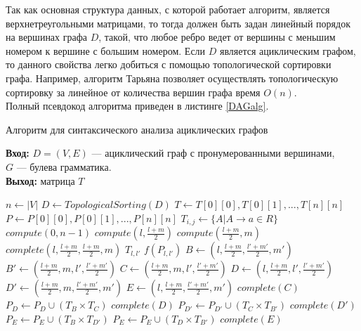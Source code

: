 \documentclass{spbau-diploma}
\begin{document}
Так как основная структура данных, с которой работает алгоритм,
является верхнетреугольными матрицами, то тогда должен быть
задан линейный порядок на вершинах графа $D$, такой, что любое
ребро ведет от вершины с меньшим номером к вершине с
большим номером. Если $D$ является ациклическим графом, то
данного свойства легко добиться с помощью топологической
сортировки графа. Например, алгоритм Тарьяна \cite{Tarjan} позволяет
осуществлять топологическую сортировку за линейное от
количества вершин графа время $O(n)$.
\\
Полный псевдокод алгоритма приведен в листинге \ref{DAGalg}.
\begin{algorithm}
\caption{Алгоритм для синтаксического анализа ациклических графов}\label{DAGalg}
 \hspace*{\algorithmicindent} \textbf{Вход:} $D = (V, E)$ --- ациклический граф с пронумерованными вершинами, \\$G$ ---  булева грамматика.\\
 \hspace*{\algorithmicindent} \textbf{Выход:} матрица $T$
\begin{algorithmic}[1]
\State $n \gets  |V|$
\State $D \gets TopologicalSorting(D)$
\State $T \gets T[0][0], T[0][1], ... , T[n] [n]$
\State $P \gets P[0][0], P[0][1], ... , P[n] [n]$
\State $T_{i,j} \gets \{A|A \to a \in R\}$
 \EndFor
\State $compute(0, n-1)$
\State $compute(l, \frac{l+m}{2})$
\State $compute(\frac{l+m}{2},m)$
\EndIf
\State $complete(l, \frac{l+m}{2}, \frac{l+m}{2}, m)$
\EndProcedure
{}
\State $T_{l,l'}$ \gets $f(P_{l,l'})$
\State $B \gets (l, \frac{l+m}{2}, \frac{l'+m'}{2}, m')$
\State $B' \gets (\frac{l+m}{2}, m, l', \frac{l'+m'}{2})$
\State $C \gets (\frac{l+m}{2}, m, l', \frac{l'+m'}{2})$
\State $D \gets (l, \frac{l+m}{2}, l', \frac{l'+m'}{2})$
\State $D' \gets (\frac{l+m}{2}, m, \frac{l'+m'}{2}, m')$
\State $E \gets (l, \frac{l+m}{2}, \frac{l'+m'}{2}, m')$
\State $complete(C)$
\State $P_D \gets P_D \cup (T_B \times T_C)$
\State $complete(D)$
\State $P_{D'} \gets P_{D'} \cup (T_C \times T_{B'})$
\State $complete(D')$
\State $P_{E} \gets P_{E} \cup (T_B \times T_{D'})$
\State $P_{E} \gets P_{E} \cup (T_D \times T_{B'})$
\State $complete(E)$
\EndIf

\EndProcedure

\end{algorithmic}
\end{algorithm}
\end{document}
